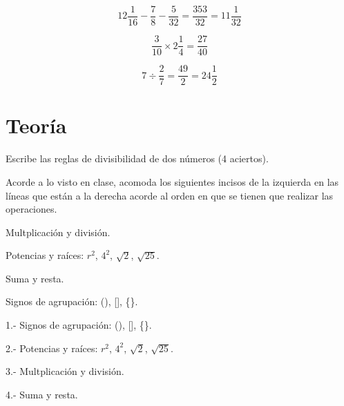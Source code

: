 \documentclass[11pt]{article}
\begin{document}
\vspace{2.5cm}

\begin{equation*}
    12\frac{1}{16} - \frac{7}{8} - \frac{5}{32}  = \frac{353}{32} = 11\frac{1}{32}
\end{equation*}

\vspace{2.5cm}

\begin{equation*}
    \frac{3}{10} \times 2\frac{1}{4} = \frac{27}{40}
\end{equation*}

\vspace{2.5cm}

\begin{equation*}
    7 \div \frac{2}{7} = \frac{49}{2} = 24\frac{1}{2}
\end{equation*}

\vspace{2.5cm}

\section{Teor\'ia}

Escribe las reglas de divisibilidad de dos n\'umeros (4 aciertos).

\vspace{2.5cm}

Acorde a lo visto en clase, acomoda los siguientes incisos de la izquierda en
las l\'ineas que est\'an a la derecha acorde al orden en que se tienen que
realizar las operaciones.

\vspace{1cm}

\begin{minipage}[t]{0.5\textwidth}
Multplicaci\'on y divisi\'on.

Potencias y ra\'ices: $r^{2}$, $4^{2}$, $\sqrt{2}$, $\sqrt{25}$.

Suma y resta.

Signos de agrupaci\'on: (), [], \{\}.

\end{minipage}
\begin{minipage}[t]{0.5\textwidth}

1.- Signos de agrupaci\'on: (), [], \{\}.

\vspace{3mm}

2.- Potencias y ra\'ices: $r^{2}$, $4^{2}$, $\sqrt{2}$, $\sqrt{25}$.

\vspace{3mm}

3.- Multplicaci\'on y divisi\'on.

\vspace{3mm}

4.- Suma y resta.

\vspace{3mm}


\end{minipage}
\end{document}
